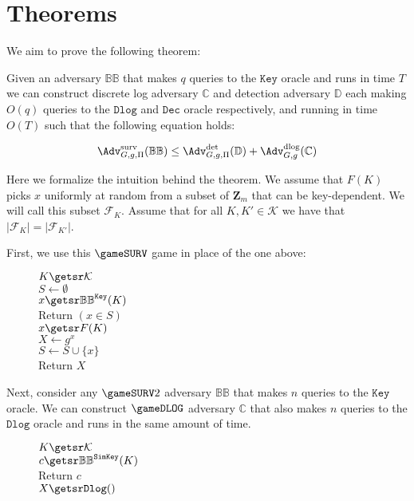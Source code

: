 \pagebreak
\section{Theorems}

We aim to prove the following theorem: 

\begin{theorem}
Given an adversary $\mathbb{BB}$ that makes $q$ queries to the $\mathtt{Key}$ oracle and runs in time $T$we can construct discrete log adversary $\mathbb{C}$ and detection adversary $\mathbb{D}$ each making $O(q)$ queries to the $\mathtt{Dlog}$ and $\mathtt{Dec}$ oracle respectively, and running in time $O(T)$ such that the following equation holds: 

$$\Adv^\text{surv}_{G,g,\Pi}(\mathbb{BB})\le \Adv^\text{det}_{G,g,\Pi}(\mathbb{D}) + \Adv^\text{dlog}_{G,g}(\mathbb{C})$$

\end{theorem}

\hrulefill

Here we formalize the intuition behind the theorem. We assume that $F(K)$ picks $x$ uniformly at random from a subset of $\mathbf{Z}_m$ that can be key-dependent. We will call this subset $\mathcal{F}_K$. Assume that for all $K,K'\in\mathcal{K}$ we have that $|\mathcal{F}_K|=|\mathcal{F}_{K'}|$.

First, we use this $\gameSURV$ game in place of the one above: 

\begin{figure}[h]
{
$K\getsr \mathcal{K}$\\
$S\gets \emptyset$\\
$x\getsr \mathbb{BB}^{\mathtt{Key}}(K)$\\
Return $(x\in S)$\\
$x\getsr F(K)$\\
$X\gets g^x$\\
$S\gets S\cup \{x\}$\\
Return $X$
}
\vspace{-1ex}
\end{figure}

Next, consider any $\gameSURV2$ adversary $\mathbb{BB}$ that makes $n$ queries to the $\mathtt{Key}$ oracle. We can construct $\gameDLOG$ adversary $\mathbb{C}$ that also makes $n$ queries to the $\mathtt{Dlog}$ oracle and runs in the same amount of time. 

\begin{figure}[h]
{
$K\getsr\mathcal{K}$\\
$c\getsr\mathbb{BB}^{\mathtt{SimKey}}(K)$\\
Return $c$\\
$X\getsr\mathtt{Dlog()}$
}
\end{figure}


